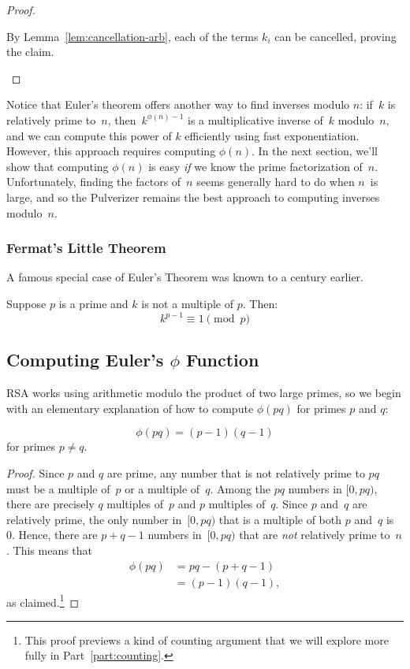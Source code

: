 \begin{proof}
\begin{editingnotes}
By Lemma~\ref{lem:cancellation-arb}, each of the terms $k_i$ can be cancelled, proving the
claim.
\end{editingnotes}
\end{proof}

Notice that Euler's theorem offers another way to find inverses modulo
$n$: if~$k$ is relatively prime to~$n$, then~$k^{\phi(n)-1}$ is a
multiplicative inverse of~$k$ modulo~$n$, and we can compute this
power of $k$ efficiently using fast exponentiation.  However, this
approach requires computing $\phi(n)$.  In the next section, we'll
show that computing $\phi(n)$ is easy \emph{if} we know the prime
factorization of~$n$.  Unfortunately, finding the factors of~$n$ seems
generally hard to do when $n$~is large, and so the Pulverizer remains
the best approach to computing inverses modulo~$n$.

\subsubsection{Fermat's Little Theorem}

A famous special case of Euler's Theorem was known to  a century earlier.
\begin{corollary}\label{fermat_little}
Suppose $p$ is a prime and $k$ is not a multiple of $p$.  Then:
\[
k^{p-1} \equiv 1 \pmod{p}
\]
\end{corollary}

\subsection{Computing Euler's $\phi$ Function}

RSA works using arithmetic modulo the product of two large primes, so we begin with an
elementary explanation of how to compute $\phi(pq)$ for primes $p$ and $q$:

\begin{lemma}\label{phi_pq}    %
\[
\phi(pq) = (p-1) (q-1)
\]
for primes $p\neq q$.
\end{lemma}

\begin{proof}
Since $p$ and $q$ are prime, any number that is not relatively prime to $pq$ must be a
multiple of~$p$ or a multiple of~$q$.  Among the $pq$ numbers in $[0, pq)$, there are
  precisely $q$ multiples of~$p$ and $p$ multiples of~$q$.  Since $p$ and~$q$ are
  relatively prime, the only number in~$[0, pq)$ that is a multiple of both $p$ and~$q$ is
    0.  Hence, there are $p + q - 1$ numbers in~$[0, pq)$ that are \emph{not} relatively
      prime to~$n$.  This means that
\begin{align*}
    \phi(pq) & = pq - (p + q - 1) \\ & = (p - 1) (q - 1),
\end{align*}
as claimed.\footnote{This proof previews a kind of counting argument that we will explore
  more fully in Part~\ref{part:counting}.}
\end{proof}

